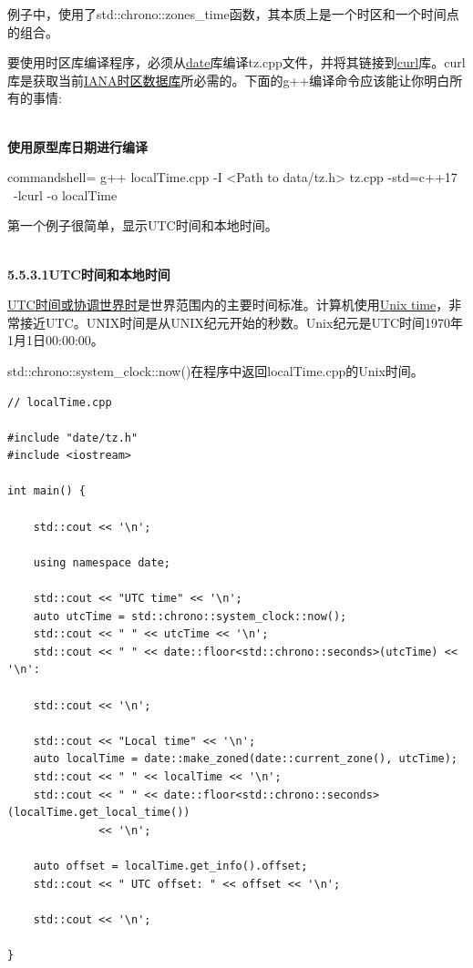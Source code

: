 例子中，使用了std::chrono::zones\_time函数，其本质上是一个时区和一个时间点的组合。

\begin{tcolorbox}[breakable,enhanced jigsaw,colback=blue!5!white,colframe=blue!75!black,title={编译示例}]
	
要使用时区库编译程序，必须从\href{https://github.com/HowardHinnant/date}{date}库编译tz.cpp文件，并将其链接到\href{https://curl. se/}{curl}库。curl库是获取当前\href{https://www.iana.org/timezones}{IANA时区数据库}所必需的。下面的g++编译命令应该能让你明白所有的事情:

\hspace*{\fill} \\ %
\noindent
\textbf{使用原型库日期进行编译}
\begin{tcblisting}{commandshell={}}
g++ localTime.cpp -I <Path to data/tz.h> tz.cpp -std=c++17 \
  -lcurl -o localTime
\end{tcblisting}

\end{tcolorbox}

第一个例子很简单，显示UTC时间和本地时间。

\hspace*{\fill} \\ %
\noindent
\textbf{5.5.3.1\hspace{0.2cm}UTC时间和本地时间}

\href{https://en.wikipedia.org/wiki/Coordinated_Universal_Time}{UTC时间或协调世界时}是世界范围内的主要时间标准。计算机使用\href{https://en.wikipedia.org/wiki/Unix_time}{Unix time}，非常接近UTC。UNIX时间是从UNIX纪元开始的秒数。Unix纪元是UTC时间1970年1月1日00:00:00。

std::chrono::system\_clock::now()在程序中返回localTime.cpp的Unix时间。

\begin{lstlisting}[style=styleCXX]
// localTime.cpp

#include "date/tz.h"
#include <iostream>

int main() {

	std::cout << '\n';
	
	using namespace date;
	
	std::cout << "UTC time" << '\n';
	auto utcTime = std::chrono::system_clock::now();
	std::cout << " " << utcTime << '\n';
	std::cout << " " << date::floor<std::chrono::seconds>(utcTime) << '\n':
	
	std::cout << '\n';
	
	std::cout << "Local time" << '\n';
	auto localTime = date::make_zoned(date::current_zone(), utcTime);
	std::cout << " " << localTime << '\n';
	std::cout << " " << date::floor<std::chrono::seconds>(localTime.get_local_time())
	          << '\n';
	
	auto offset = localTime.get_info().offset;
	std::cout << " UTC offset: " << offset << '\n';

	std::cout << '\n';

}
\end{lstlisting}

